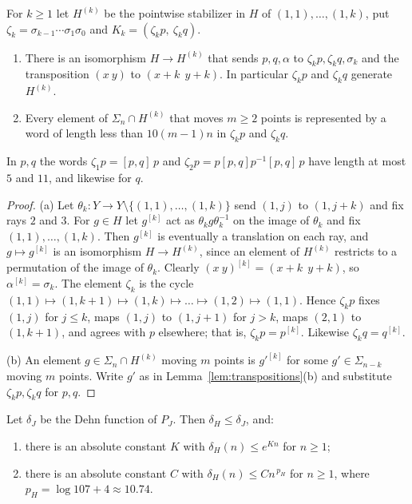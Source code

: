 \begin{lemma}\label{lem:stabilizers}
For $k\ge1$ let $H^{(k)}$ be the pointwise stabilizer in $H$ of $(1,1),\dots,(1,k)$, put $\zeta_k=\sigma_{k-1}\cdots\sigma_1\sigma_0$ and
$K_k=(\zeta_kp,\ \zeta_kq)$.
\begin{enumerate}[label=(\alph*),itemsep=1pt]
\item There is an isomorphism $H\to H^{(k)}$ that sends $p,q,\alpha$ to $\zeta_kp,\zeta_kq,\sigma_k$ and the transposition $(x\ y)$ to
$(x{+}k\ \ y{+}k)$. In particular $\zeta_kp$ and $\zeta_kq$ generate $H^{(k)}$.
\item Every element of $\Sigma_n\cap H^{(k)}$ that moves $m\ge2$ points is represented by a word of length less than $10(m-1)n$ in $\zeta_kp$ and
$\zeta_kq$.
\end{enumerate}
In $p,q$ the words $\zeta_1p=[p,q]\,p$ and $\zeta_2p=p[p,q]p^{-1}[p,q]\,p$ have length at most $5$ and $11$, and likewise for $q$.
\end{lemma}

\begin{proof}
(a) Let $\theta_k:Y\to Y\setminus\{(1,1),\dots,(1,k)\}$ send $(1,j)$ to $(1,j+k)$ and fix rays $2$ and $3$. For $g\in H$ let $g^{[k]}$ act as
$\theta_kg\theta_k^{-1}$ on the image of $\theta_k$ and fix $(1,1),\dots,(1,k)$. Then $g^{[k]}$ is eventually a translation on each ray, and
$g\mapsto g^{[k]}$ is an isomorphism $H\to H^{(k)}$, since an element of $H^{(k)}$ restricts to a permutation of the image of $\theta_k$. Clearly
$(x\ y)^{[k]}=(x{+}k\ \ y{+}k)$, so $\alpha^{[k]}=\sigma_k$. The element $\zeta_k$ is the cycle $(1,1)\mapsto(1,k+1)\mapsto(1,k)\mapsto\dots\mapsto(1,2)\mapsto(1,1)$.
Hence $\zeta_kp$ fixes $(1,j)$ for $j\le k$, maps $(1,j)$ to $(1,j+1)$ for $j>k$, maps $(2,1)$ to $(1,k+1)$, and agrees with $p$ elsewhere; that is,
$\zeta_kp=p^{[k]}$. Likewise $\zeta_kq=q^{[k]}$.

(b) An element $g\in\Sigma_n\cap H^{(k)}$ moving $m$ points is $g'^{[k]}$ for some $g'\in\Sigma_{n-k}$ moving $m$ points. Write $g'$ as in
Lemma~\ref{lem:transpositions}(b) and substitute $\zeta_kp,\zeta_kq$ for $p,q$.
\end{proof}

\begin{proposition}\label{prop:dehn}
Let $\delta_J$ be the Dehn function of $P_J$. Then $\delta_H\le\delta_J$, and:
\begin{enumerate}[label=(\alph*),itemsep=1pt]
\item there is an absolute constant $K$ with $\delta_H(n)\le e^{Kn}$ for $n\ge1$;
\item there is an absolute constant $C$ with $\delta_H(n)\le Cn^{\,p_H}$ for $n\ge1$, where $p_H=\log107+4\approx10.74$.
\end{enumerate}
\end{proposition}

